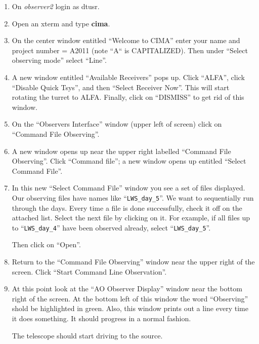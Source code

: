 \begin{enumerate}

\item On {\it observer2} login as dtusr.

\item Open an xterm and type {\bf cima}.

\item On the center window entitled ``Welcome to CIMA'' enter your name
and project number = A2011 (note ``A`` is CAPITALIZED).  Then under
``Select observing mode'' select ``Line''.

\item A new window entitled ``Available Receivers'' pops up.  Click
``ALFA'', click ``Disable Quick Tsys'', and then ``Select Receiver
Now''.  This will start rotating the turret to ALFA.  Finally, click on
``DISMISS'' to get rid of this window.

\item On the ``Observers Interface'' window (upper left of screen) click
on ``Command File Observing''.  

\item A new window opens up near the upper right labelled ``Command
File Observing''.  Click ``Command file''; a new window opens up
entitled ``Select Command File''.  

\item In this new ``Select Command File'' window you see a set of files
displayed.  Our observing files have names like ``\verb$LWS_day_5$''.  We want
to sequentially run through the days.  Every time a file is done
successfully, check it off on the attached list.  Select the next file
by clicking on it.  For example, if all files up to ``\verb$LWS_day_4$'' have
been observed already, select ``\verb$LWS_day_5$''. 

Then click on ``Open''.

\item Return to the ``Command File Observing'' window near the upper
right of the screen. Click ``Start Command Line Observation''.

\item At this point look at the ``AO Observer Display'' window near the
bottom right of the screen.  At the bottom left of this window the word
``Observing'' shold be highlighted in green.  Also, this window prints
out a line every time it does something.  It should progress in a normal
fashion.  

The telescope should start driving to the source. 


\end{enumerate}
